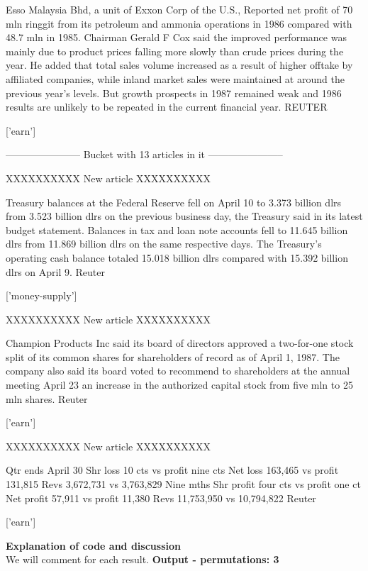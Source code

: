 \documentclass{article}
\begin{document}
\begin{pythonOutput}
Esso Malaysia Bhd, a unit of Exxon
Corp of the U.S., Reported net profit of 70 mln ringgit from
its petroleum and ammonia operations in 1986 compared with 48.7
mln in 1985. Chairman Gerald F Cox said the improved
performance was mainly due to product prices falling more
slowly than crude prices during the year.
    He added that total sales volume increased as a result of
higher offtake by affiliated companies, while inland market
sales were maintained at around the previous year's levels.
    But growth prospects in 1987 remained weak and 1986 results
are unlikely to be repeated in the current financial year.
 REUTER

['earn']

-----------------------
Bucket with 13 articles in it
-----------------------


XXXXXXXXXX
New article
XXXXXXXXXX

Treasury balances at the Federal
Reserve fell on April 10 to 3.373 billion dlrs from 3.523
billion dlrs on the previous business day, the Treasury said in
its latest budget statement.
    Balances in tax and loan note accounts fell to 11.645
billion dlrs from 11.869 billion dlrs on the same respective
days.
    The Treasury's operating cash balance totaled 15.018
billion dlrs compared with 15.392 billion dlrs on April 9.
 Reuter

['money-supply']

XXXXXXXXXX
New article
XXXXXXXXXX

Champion Products Inc said its
board of directors approved a two-for-one stock split of its
common shares for shareholders of record as of April 1, 1987.
    The company also said its board voted to recommend to
shareholders at the annual meeting April 23 an increase in the
authorized capital stock from five mln to 25 mln shares.
 Reuter

['earn']

XXXXXXXXXX
New article
XXXXXXXXXX

Qtr ends April 30
    Shr loss 10 cts vs profit nine cts
    Net loss 163,465 vs profit 131,815
    Revs 3,672,731 vs 3,763,829
    Nine mths
    Shr profit four cts vs profit one ct
    Net profit 57,911 vs profit 11,380
    Revs 11,753,950 vs 10,794,822
 Reuter

['earn']

\end{pythonOutput}
\textbf{Explanation of code and discussion}\\
We will comment for each result.
\textbf{Output - permutations: 3}\\
\end{document}
